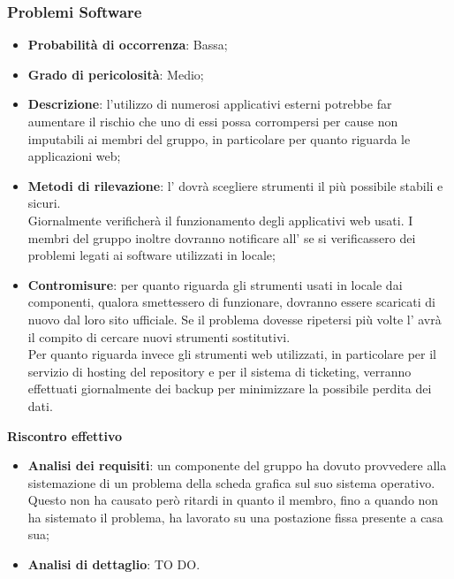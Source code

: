 		\subsubsection{Problemi Software} %
		\label{ssub:problemi_software}
			\begin{itemize}
				\item \textbf{Probabilità di occorrenza}: Bassa;
				\item \textbf{Grado di pericolosità}: Medio;
				\item \textbf{Descrizione}: l'utilizzo di numerosi applicativi esterni potrebbe far aumentare il rischio che uno di essi possa corrompersi per cause non imputabili ai membri del gruppo, in particolare per quanto riguarda le applicazioni web;
				\item \textbf{Metodi di rilevazione}: l'\roleAdministrator{} dovrà scegliere strumenti il più possibile stabili e sicuri. \\
				Giornalmente verificherà il funzionamento degli applicativi web usati. I membri del gruppo inoltre dovranno notificare all'\roleAdministrator{} se si verificassero dei problemi legati ai software utilizzati in locale;
				\item \textbf{Contromisure}: per quanto riguarda gli strumenti usati in locale dai componenti, qualora smettessero di funzionare, dovranno essere scaricati di nuovo dal loro sito ufficiale. Se il problema dovesse ripetersi più volte l'\roleAdministrator{} avrà il compito di cercare nuovi strumenti sostitutivi. \\
				Per quanto riguarda invece gli strumenti web utilizzati, in particolare per il servizio di hosting del repository e per il sistema di ticketing, verranno effettuati giornalmente dei backup per minimizzare la possibile perdita dei dati.
			\end{itemize}
		\noindent
		\textbf{Riscontro effettivo}
			\begin{itemize}
				\item \textbf{Analisi dei requisiti}: un componente del gruppo ha dovuto provvedere alla sistemazione di un problema della scheda grafica sul suo sistema operativo. \newline
				Questo non ha causato però ritardi in quanto il membro, fino a quando non ha sistemato il problema, ha lavorato su una postazione fissa presente a casa sua;
				\item \textbf{Analisi di dettaglio}: TO DO.
			\end{itemize}


